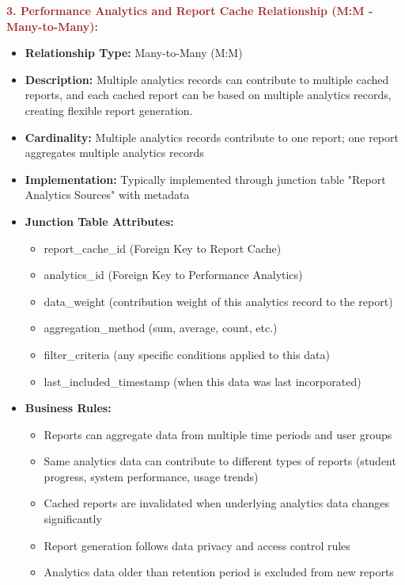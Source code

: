 \documentclass[12pt,a4paper,oneside]{book}
\begin{document}
\textbf{\textcolor{brown}{3. Performance Analytics and Report Cache Relationship (M:M - Many-to-Many):}}
\begin{itemize}
    \item \textbf{Relationship Type:} Many-to-Many (M:M)
    \item \textbf{Description:} Multiple analytics records can contribute to multiple cached reports, and each cached report can be based on multiple analytics records, creating flexible report generation.
    \item \textbf{Cardinality:} Multiple analytics records contribute to one report; one report aggregates multiple analytics records
    \item \textbf{Implementation:} Typically implemented through junction table "Report Analytics Sources" with metadata
    \item \textbf{Junction Table Attributes:}
        \begin{itemize}
            \item report\_cache\_id (Foreign Key to Report Cache)
            \item analytics\_id (Foreign Key to Performance Analytics)
            \item data\_weight (contribution weight of this analytics record to the report)
            \item aggregation\_method (sum, average, count, etc.)
            \item filter\_criteria (any specific conditions applied to this data)
            \item last\_included\_timestamp (when this data was last incorporated)
        \end{itemize}
    \item \textbf{Business Rules:}
        \begin{itemize}
            \item Reports can aggregate data from multiple time periods and user groups
            \item Same analytics data can contribute to different types of reports (student progress, system performance, usage trends)
            \item Cached reports are invalidated when underlying analytics data changes significantly
            \item Report generation follows data privacy and access control rules
            \item Analytics data older than retention period is excluded from new reports
        \end{itemize}

\end{itemize}
\end{document}
